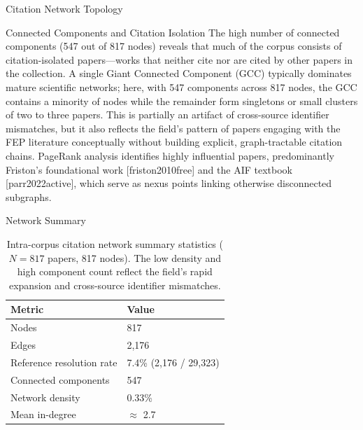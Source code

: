 \documentclass[
  ignorenonframetext,
]{beamer}
\providecommand{\citep}[1]{[#1]}
\begin{document}
\begin{frame}[allowframebreaks]{Citation Network Topology
\label{sec:citation_network}}
\begin{block}{Connected Components and Citation Isolation}
\protect{}\label{connected-components-and-citation-isolation}
The high number of connected components (547 out of 817 nodes) reveals
that much of the corpus consists of citation-isolated papers---works
that neither cite nor are cited by other papers in the collection. A
single Giant Connected Component (GCC) typically dominates mature
scientific networks; here, with 547 components across 817 nodes, the GCC
contains a minority of nodes while the remainder form singletons or
small clusters of two to three papers. This is partially an artifact of
cross-source identifier mismatches, but it also reflects the field's
pattern of papers engaging with the FEP literature conceptually without
building explicit, graph-tractable citation chains. PageRank analysis
identifies highly influential papers, predominantly Friston's
foundational work \citep{friston2010free} and the AIF textbook
\citep{parr2022active}, which serve as nexus points linking otherwise
disconnected subgraphs.
\end{block}

\begin{block}{Network Summary}
\protect{}\label{network-summary}
\begin{table}[htbp]
\centering
\caption{Intra-corpus citation network summary statistics ($N = 817$ papers, 817 nodes). The low density and high component count reflect the field's rapid expansion and cross-source identifier mismatches.}
\label{tab:citation_network}
\begin{tabular}{ll}
\toprule
\textbf{Metric} & \textbf{Value} \\
\midrule
Nodes & 817 \\
Edges & 2,176 \\
Reference resolution rate & 7.4\% (2,176 / 29,323) \\
Connected components & 547 \\
Network density & 0.33\% \\
Mean in-degree & $\approx$ 2.7 \\
\bottomrule
\end{tabular}
\end{table}


\end{block}
\end{frame}
\end{document}
